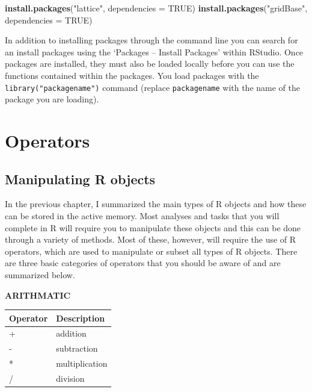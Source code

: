 \documentclass[
]{book}
\newenvironment{Shaded}{\begin{snugshade}}{\end{snugshade}}
\newcommand{\AttributeTok}[1]{\textcolor[rgb]{0.13,0.29,0.53}{#1}}
\newcommand{\ConstantTok}[1]{\textcolor[rgb]{0.56,0.35,0.01}{#1}}
\newcommand{\FunctionTok}[1]{\textcolor[rgb]{0.13,0.29,0.53}{\textbf{#1}}}
\newcommand{\NormalTok}[1]{#1}
\newcommand{\StringTok}[1]{\textcolor[rgb]{0.31,0.60,0.02}{#1}}
\begin{document}
\begin{Shaded}
\begin{Highlighting}[]
\FunctionTok{install.packages}\NormalTok{(}\StringTok{"lattice"}\NormalTok{, }\AttributeTok{dependencies =} \ConstantTok{TRUE}\NormalTok{)}
\FunctionTok{install.packages}\NormalTok{(}\StringTok{"gridBase"}\NormalTok{, }\AttributeTok{dependencies =} \ConstantTok{TRUE}\NormalTok{)}
\end{Highlighting}
\end{Shaded}

In addition to installing packages through the command line you can search for an install packages using the `Packages -- Install Packages' within RStudio. Once packages are installed, they must also be loaded locally before you can use the functions contained within the packages. You load packages with the \texttt{library("packagename")} command (replace \texttt{packagename} with the name of the package you are loading).

\hypertarget{operators}{%
\chapter{Operators}\label{operators}}

\hypertarget{manipulating-r-objects}{%
\section{Manipulating R objects}\label{manipulating-r-objects}}

In the previous chapter, I summarized the main types of R objects and how these can be stored in the active memory. Most analyses and tasks that you will complete in R will require you to manipulate these objects and this can be done through a variety of methods. Most of these, however, will require the use of R operators, which are used to manipulate or subset all types of R objects. There are three basic categories of operators that you should be aware of and are summarized below.

\textbf{ARITHMATIC}

\begin{longtable}[]{@{}ll@{}}
\toprule\noalign{}
\textbf{Operator} & \textbf{Description} \\
\midrule\noalign{}
\endhead
\bottomrule\noalign{}
\endlastfoot
+ & addition \\
- & subtraction \\
* & multiplication \\
/ & division \\
\end{longtable}
\end{document}
